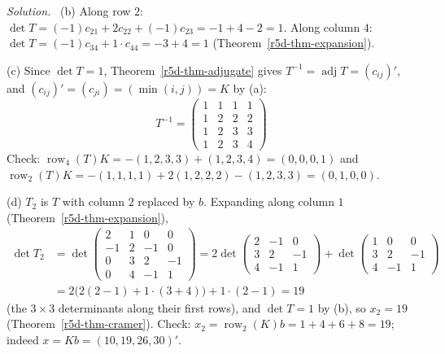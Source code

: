 \documentclass[12pt]{article}
\DeclareMathOperator{\row}{row}
\theoremstyle{definition}
\newenvironment{solution}{\par\noindent\textit{Solution.}\ }{\par\smallskip}
\begin{document}
\begin{solution}
(b) Along row \(2\): \(\det T=(-1)c_{21}+2c_{22}+(-1)c_{23}=-1+4-2=1\). Along column \(4\):
\(\det T=(-1)c_{34}+1\cdot c_{44}=-3+4=1\) (Theorem~\ref{r5d-thm-expansion}).

(c) Since \(\det T=1\), Theorem~\ref{r5d-thm-adjugate} gives \(T^{-1}=\operatorname{adj}T=(c_{ij})'\),
and \((c_{ij})'=(c_{ji})=(\min(i,j))=K\) by (a):
\[
T^{-1}=\begin{pmatrix}1&1&1&1\\1&2&2&2\\1&2&3&3\\1&2&3&4\end{pmatrix}
\]
Check: \(\row_4(T)K=-(1,2,3,3)+(1,2,3,4)=(0,0,0,1)\) and
\(\row_2(T)K=-(1,1,1,1)+2(1,2,2,2)-(1,2,3,3)=(0,1,0,0)\).

(d) \(T_2\) is \(T\) with column \(2\) replaced by \(b\). Expanding along column \(1\) (Theorem~\ref{r5d-thm-expansion}),
\[
\begin{aligned}
\det T_2&=\det\begin{pmatrix}2&1&0&0\\-1&2&-1&0\\0&3&2&-1\\0&4&-1&1\end{pmatrix}
=2\det\begin{pmatrix}2&-1&0\\3&2&-1\\4&-1&1\end{pmatrix}+\det\begin{pmatrix}1&0&0\\3&2&-1\\4&-1&1\end{pmatrix}\\
&=2\bigl(2(2-1)+1\cdot(3+4)\bigr)+1\cdot(2-1)=19
\end{aligned}
\]
(the \(3\times3\) determinants along their first rows), and \(\det T=1\) by (b), so \(x_2=19\) (Theorem~\ref{r5d-thm-cramer}). Check: \(x_2=\row_2(K)b=1+4+6+8=19\);
indeed \(x=Kb=(10,19,26,30)'\).
\end{solution}
\end{document}
